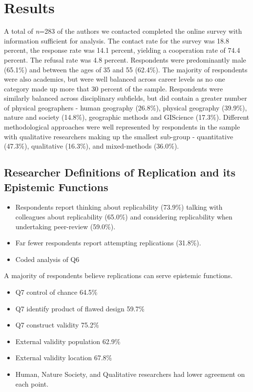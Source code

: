 \documentclass[]{interact}
\theoremstyle{plain}%
\theoremstyle{definition}
\theoremstyle{remark}
\begin{document}
\section*{Results}
A total of \textit{n}=283 of the authors we contacted completed the online survey with information sufficient for analysis. 
The contact rate for the survey was 18.8 percent, the response rate was 14.1 percent, yielding a cooperation rate of 74.4 percent. 
The refusal rate was 4.8 percent.
Respondents were predominantly male (65.1\%) and between the ages of 35 and 55 (62.4\%). 
The majority of respondents were also academics, but were well balanced across career levels as no one category made up more that 30 percent of the sample.
Respondents were similarly balanced across disciplinary subfields, but did contain a greater number of physical geographers  - human geography (26.8\%), physical geography (39.9\%), nature and society (14.8\%), geographic methods and GIScience (17.3\%). 
Different methodological approaches were well represented by respondents in the sample with qualitative researchers making up the smallest sub-group  - quantitative (47.3\%), qualitative (16.3\%), and mixed-methods (36.0\%).

\subsection*{Researcher Definitions of Replication and its Epistemic Functions}
\begin{itemize}
    \item Respondents report thinking about replicability (73.9\%) talking with colleagues about replicability (65.0\%) and considering replicability when undertaking peer-review (59.0\%). 
    \item Far fewer respondents report attempting replications (31.8\%). 
\end{itemize}

\begin{itemize}
    \item Coded analysis of Q6
\end{itemize}

A majority of respondents believe replications can serve epistemic functions.
\begin{itemize}
    \item Q7 control of chance 64.5\%
    \item Q7 identify product of flawed design 59.7\%
    \item Q7 construct validity 75.2\%
    \item External validity population 62.9\%
    \item External validity location 67.8\%
    \item Human, Nature Society, and Qualitative researchers had lower agreement on each point.
\end{itemize}
\end{document}
